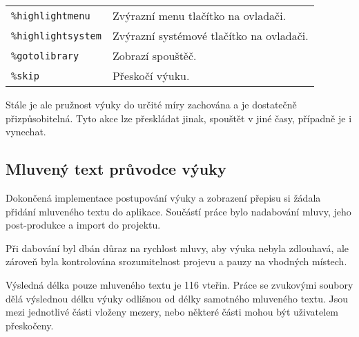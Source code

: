 \begin{longtable}[]{@{}ll@{}}
\begin{minipage}[t]{0.05\columnwidth}
\texttt{\%highlightmenu}\strut
\end{minipage} & \begin{minipage}[t]{0.05\columnwidth}\raggedright\strut
Zvýrazní menu tlačítko na ovladači.\strut
\end{minipage}\tabularnewline
\begin{minipage}[t]{0.05\columnwidth}\raggedright\strut
\texttt{\%highlightsystem}\strut
\end{minipage} & \begin{minipage}[t]{0.05\columnwidth}\raggedright\strut
Zvýrazní systémové tlačítko na ovladači.\strut
\end{minipage}\tabularnewline
\begin{minipage}[t]{0.05\columnwidth}\raggedright\strut
\texttt{\%gotolibrary}\strut
\end{minipage} & \begin{minipage}[t]{0.05\columnwidth}\raggedright\strut
Zobrazí spouštěč.\strut
\end{minipage}\tabularnewline
\begin{minipage}[t]{0.05\columnwidth}\raggedright\strut
\texttt{\%skip}\strut
\end{minipage} & \begin{minipage}[t]{0.05\columnwidth}\raggedright\strut
Přeskočí výuku.\strut
\end{minipage}\tabularnewline
\bottomrule
\end{longtable}

Stále je ale pružnost výuky do určité míry zachována a je dostatečně
přizpůsobitelná. Tyto akce lze přeskládat jinak, spouštět v jiné časy,
případně je i vynechat.

\subsection{Mluvený text průvodce
výuky}\label{mluvenuxfd-text-prux16fvodce-vuxfduky}

Dokončená implementace postupování výuky a zobrazení přepisu si žádala
přidání mluveného textu do aplikace. Součástí práce bylo nadabování
mluvy, jeho post-produkce a import do projektu.

Při dabování byl dbán důraz na rychlost mluvy, aby výuka nebyla
zdlouhavá, ale zároveň byla kontrolována srozumitelnost projevu a pauzy
na vhodných místech.

Výsledná délka pouze mluveného textu je 116 vteřin. Práce se zvukovými
soubory dělá výslednou délku výuky odlišnou od délky samotného mluveného
textu. Jsou mezi jednotlivé části vloženy mezery, nebo některé části
mohou být uživatelem přeskočeny. 

